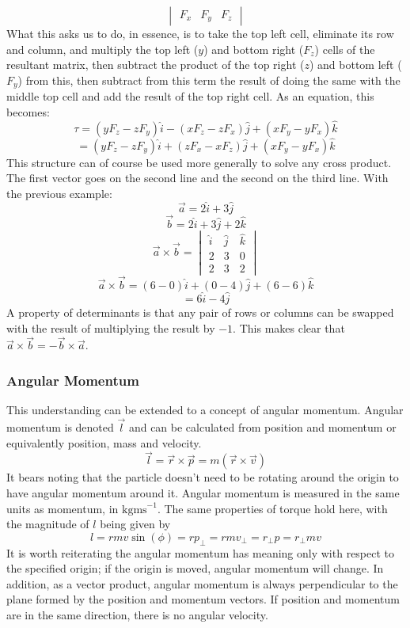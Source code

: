 \documentclass[12pt]{report}
\begin{document}
\begin{flushleft}
\[\begin{vmatrix}
        F_x & F_y & F_z
    \end{vmatrix}
\]
What this asks us to do, in essence, is to take the top left cell, eliminate
its row and column, and multiply the top left (\(y\)) and bottom right 
(\(F_z\)) cells of the resultant matrix, then subtract the product of the top
right (\(z\)) and bottom left (\(F_y\)) from this, then subtract from this term
the result of doing the same with the middle top cell and add the result of the
top right cell. As an equation, this becomes:
\[\tau = (yF_z - zF_y)\hat{i} - (xF_z - zF_x)\hat{j} + (xF_y - yF_x)\hat{k}\]
\[= (yF_z - zF_y)\hat{i} + (zF_x - xF_z)\hat{j} + (xF_y - yF_x)\hat{k}\]
This structure can of course be used more generally to solve any cross product.
The first vector goes on the second line and the second on the third line. With
the previous example:
\[\vec{a} = 2\hat{i} + 3\hat{j}\]
\[\vec{b} = 2\hat{i} + 3\hat{j} + 2\hat{k}\]
\[\vec{a} \times \vec{b} = 
    \begin{vmatrix}
        \hat{i}\: & \hat{j}\: & \hat{k} \\
        2 & 3 & 0 \\
        2 & 3 & 2
    \end{vmatrix}
\]
\[\vec{a} \times \vec{b} = (6 - 0)\hat{i} + (0 - 4)\hat{j} + (6 - 6)\hat{k}\]
\[= 6\hat{i} - 4\hat{j}\]
A property of determinants is that any pair of rows or columns can be swapped
with the result of multiplying the result by \(-1\). This makes clear that 
\(\vec{a}\times\vec{b} = -\vec{b}\times\vec{a}\).

\subsubsection*{Angular Momentum}
This understanding can be extended to a concept of angular momentum. Angular
momentum is denoted \(\vec{l}\) and can be calculated from position and 
momentum or equivalently position, mass and velocity.
\[\vec{l} = \vec{r} \times \vec{p} = m(\vec{r} \times \vec{v})\]
It bears noting that the particle doesn't need to be rotating around the origin
to have angular momentum around it. Angular momentum is measured in the same 
units as momentum, in \(\mathrm{kgms}^{-1}\). The same properties of torque 
hold here, with the magnitude of \(l\) being given by
\[l = rmv\sin(\phi) = rp_\perp = rmv_\perp = r_\perp p = r_\perp mv\]
It is worth reiterating the angular momentum has meaning only with respect to
the specified origin; if the origin is moved, angular momentum will change. In
addition, as a vector product, angular momentum is always perpendicular to the
plane formed by the position and momentum vectors. If position and momentum
are in the same direction, there is no angular velocity.


\end{flushleft}
\end{document}
